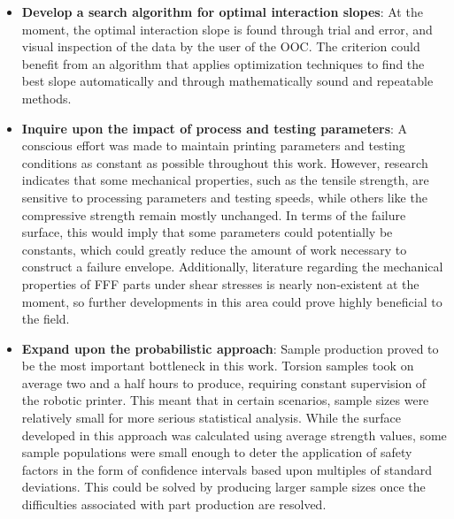 \documentclass[main.tex]{subfiles}
\begin{document}
\begin{itemize}
	\item \textbf{Develop a search algorithm for optimal interaction slopes}: At the moment, the optimal interaction slope is found through trial and error, and visual inspection of the data by the user of the OOC. The criterion could benefit from an algorithm that applies optimization techniques to find the best slope automatically and through mathematically sound and repeatable methods. 
	\item \textbf{Inquire upon the impact of process and testing parameters}: A conscious effort was made to maintain printing parameters and testing conditions as constant as possible throughout this work. However, research indicates that some mechanical properties, such as the tensile strength, are sensitive to processing parameters and testing speeds, while others like the compressive strength remain mostly unchanged. In terms of the failure surface, this would imply that some parameters could potentially be constants, which could greatly reduce the amount of work necessary to construct a failure envelope. Additionally, literature regarding the mechanical properties of FFF parts under shear stresses is nearly non-existent at the moment, so further developments in this area could prove highly beneficial to the field. 
	\item \textbf{Expand upon the probabilistic approach}: Sample production proved to be the most important bottleneck in this work. Torsion samples took on average two and a half hours to produce, requiring constant supervision of the robotic printer. This meant that in certain scenarios, sample sizes were relatively small for more serious statistical analysis. While the surface developed in this approach was calculated using average strength values, some sample populations were small enough to deter the application of safety factors in the form of confidence intervals based upon multiples of standard deviations. This could be solved by producing larger sample sizes once the difficulties associated with part production are resolved. 
\end{itemize}
\end{document}
